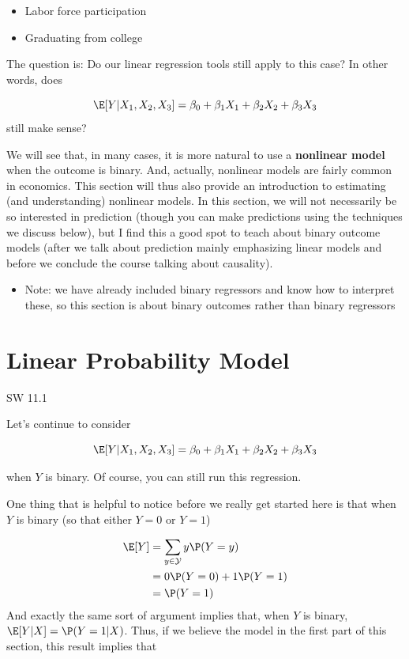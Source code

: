 \documentclass[
  letterpaper,
  DIV=11,
  numbers=noendperiod]{scrreprt}
\providecommand{\tightlist}{%
  \setlength{\itemsep}{0pt}\setlength{\parskip}{0pt}}\usepackage{longtable,booktabs,array}
\begin{document}
\begin{itemize}
\item
  Labor force participation
\item
  Graduating from college
\end{itemize}

The question is: Do our linear regression tools still apply to this
case? In other words, does

\[
  \E[Y | X_1, X_2, X_3] = \beta_0 + \beta_1 X_1 + \beta_2 X_2 + \beta_3 X_3
\] still make sense?

We will see that, in many cases, it is more natural to use a
\textbf{nonlinear model} when the outcome is binary. And, actually,
nonlinear models are fairly common in economics. This section will thus
also provide an introduction to estimating (and understanding) nonlinear
models. In this section, we will not necessarily be so interested in
prediction (though you can make predictions using the techniques we
discuss below), but I find this a good spot to teach about binary
outcome models (after we talk about prediction mainly emphasizing linear
models and before we conclude the course talking about causality).

\begin{itemize}
\tightlist
\item
  Note: we have already included binary regressors and know how to
  interpret these, so this section is about binary outcomes rather than
  binary regressors
\end{itemize}

\section{Linear Probability Model}\label{linear-probability-model}

SW 11.1

Let's continue to consider

\[
  \E[Y|X_1,X_2,X_3] = \beta_0 + \beta_1 X_1 + \beta_2 X_2 + \beta_3 X_3
\]

when \(Y\) is binary. Of course, you can still run this regression.

One thing that is helpful to notice before we really get started here is
that when \(Y\) is binary (so that either \(Y=0\) or \(Y=1\))

\[
  \begin{aligned}
  \E[Y] &= \sum_{y \in \mathcal{Y}} y \P(Y=y) \\
  &= 0 \P(Y=0) + 1 \P(Y=1) \\
  &= \P(Y=1)
  \end{aligned}
\] And exactly the same sort of argument implies that, when \(Y\) is
binary, \(\E[Y|X] = \P(Y=1|X)\). Thus, if we believe the model in the
first part of this section, this result implies that
\end{document}
